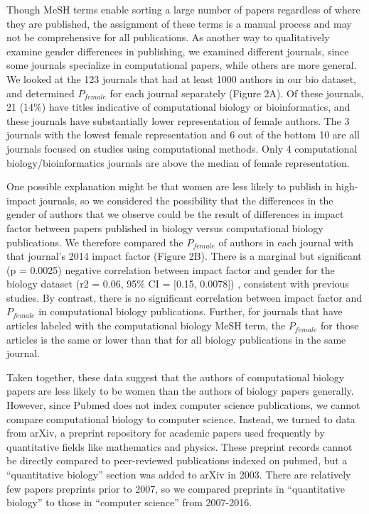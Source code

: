\documentclass[11pt]{article}
\begin{document}
Though MeSH terms enable sorting a large number of papers regardless of where they are published, the assignment of these terms is a manual process and may not be comprehensive for all publications. As another way to qualitatively examine gender differences in publishing, we examined different journals, since some journals specialize in computational papers, while others are more general. We looked at the 123  journals that had at least 1000 authors in our bio dataset, and determined $P_{female}$ for each journal separately (Figure 2A). Of these journals, 21 (14\%) have titles indicative of computational biology or bioinformatics, and these journals have substantially lower representation of female authors. The 3 journals with the lowest female representation and 6 out of the bottom 10 are all journals focused on studies using computational methods. Only 4 computational biology/bioinformatics journals are above the median of female representation.

One possible explanation might be that women are less likely to publish in high-impact journals, so we considered the possibility that the differences in the gender of authors that we observe could be the result of differences in impact factor between papers published in biology versus computational biology publications. We therefore compared the $P_{female}$ of authors in each journal with that journal’s 2014 impact factor (Figure 2B). There is a marginal but significant (p = 0.0025) negative correlation between impact factor and gender for the biology dataset (r2 = 0.06, 95\% CI = [0.15, 0.0078]) , consistent with previous studies. By contrast, there is no significant correlation between impact factor and $P_{female}$ in computational biology publications. Further, for journals that have articles labeled with the computational biology MeSH term, the $P_{female}$ for those articles is the same or lower than that for all biology publications in the same journal.

Taken together, these data suggest that the authors of computational biology papers are less likely to be women than the authors of biology papers generally. However, since Pubmed does not index computer science publications, we cannot compare computational biology to computer science. Instead, we turned to data from arXiv, a preprint repository for academic papers used frequently by quantitative fields like mathematics and physics. These preprint records cannot be directly compared to peer-reviewed publications indexed on pubmed, but a “quantitative biology” section was added to arXiv in 2003. There are relatively few papers preprints prior to 2007, so we compared preprints in “quantitative biology” to those in “computer science” from 2007-2016.
\end{document}
